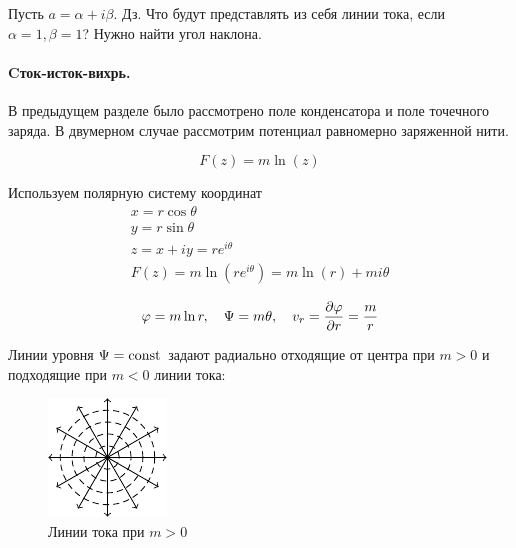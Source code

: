 Пусть $a=\alpha + i\beta$.
Дз. Что будут представлять из себя линии тока, если $\alpha=1,\beta=1$? Нужно найти угол наклона.

\paragraph{Cток-исток-вихрь.} В предыдущем разделе было рассмотрено поле конденсатора и поле точечного заряда. В двумерном случае рассмотрим потенциал равномерно заряженной нити.

\begin{equation}
	F(z)=m\ln(z)
\end{equation}

Используем полярную систему координат
\begin{gather}
	\label{eqss}
	x=r\cos\theta\\
	y=r\sin\theta\\
	z=x+iy=re^{i\theta}\\
	F(z)=m\ln(re^{i\theta})=m\ln(r)+mi\theta
\end{gather}

\begin{equation}
	\varphi=m\ln{r}, \quad \Psi=m\theta, \quad v_r=\pdv{\varphi}{r}=\frac{m}{r}
\end{equation}

Линии уровня $\Psi=\mathrm{const}\,$ задают радиально отходящие от центра при $m>0$ и подходящие при $m<0$ линии тока:
\begin{figure}[h!]
    \centering
    \includegraphics[scale=1.5]{img/stok-vihr}
    \caption{Линии тока при $m>0$}
    \label{fig:figure1}
\end{figure}

